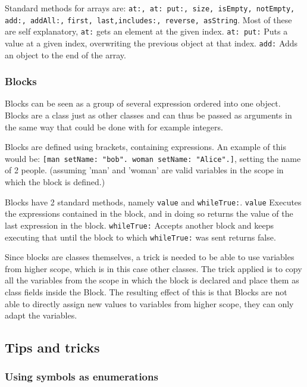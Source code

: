 \documentclass[a4paper]{article}
\begin{document}
Standard methods for arrays are:
\texttt{at:, at: put:, size, isEmpty, notEmpty, add:, addAll:,}
\texttt{first, last,includes:, reverse, asString}. Most of these are self explanatory, \texttt{at:} gets an element at the given index. \texttt{at: put:} Puts a value at a given index, overwriting the previous object at that index. \texttt{add:} Adds an object to the end of the array.


\subsubsection{Blocks}

Blocks can be seen as a group of several expression ordered into one object. Blocks are a class just as other classes and can thus be passed as arguments in the same way that could be done with for example integers.

Blocks are defined using brackets, containing expressions. An example of this would be:
\texttt{[man setName: "bob". woman setName: "Alice".]}, setting the name of 2 people. (assuming 'man' and 'woman' are valid variables in the scope in which the block is defined.)

Blocks have 2 standard methods, namely \texttt{value} and \texttt{whileTrue:}. \texttt{value} Executes the expressions contained in the block, and in doing so returns the value of the last expression in the block. \texttt{whileTrue:} Accepts another block and keeps executing that until the block to which \texttt{whileTrue:} was sent returns false.

Since blocks are classes themselves, a trick is needed to be able to use variables from higher scope, which is in this case other classes. The trick applied is to copy all the variables from the scope in which the block is declared and place them as class fields inside the Block. The resulting effect of this is that Blocks are not able to directly assign new values to variables from higher scope, they can only adapt the variables.



\subsection{Tips and tricks}

\subsubsection{Using symbols as enumerations}
\end{document}
